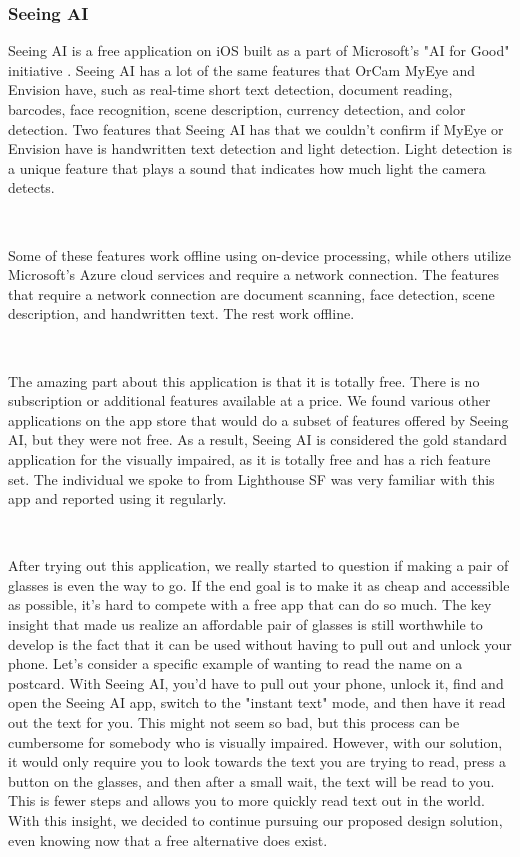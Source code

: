 \documentclass[a4paper,11pt]{article}
\begin{document}
\newpage
\subsubsection{Seeing AI}
Seeing AI is a free application on iOS built as a part of Microsoft's "AI for Good" initiative \cite{seeing-ai}. Seeing AI has a lot of the same features that OrCam MyEye and Envision have, such as real-time short text detection, document reading, barcodes, face recognition, scene description, currency detection, and color detection. Two features that Seeing AI has that we couldn't confirm if MyEye or Envision have is handwritten text detection and light detection. Light detection is a unique feature that plays a sound that indicates how much light the camera detects. 

\

\noindent
Some of these features work offline using on-device processing, while others utilize Microsoft's Azure cloud services and require a network connection. The features that require a network connection are document scanning, face detection, scene description, and handwritten text. The rest work offline.

\ 

\noindent
The amazing part about this application is that it is totally free. There is no subscription or additional features available at a price. We found various other applications on the app store that would do a subset of features offered by Seeing AI, but they were not free. As a result, Seeing AI is considered the gold standard application for the visually impaired, as it is totally free and has a rich feature set. The individual we spoke to from Lighthouse SF was very familiar with this app and reported using it regularly.

\

\noindent
After trying out this application, we really started to question if making a pair of glasses is even the way to go. If the end goal is to make it as cheap and accessible as possible, it's hard to compete with a free app that can do so much. The key insight that made us realize an affordable pair of glasses is still worthwhile to develop is the fact that it can be used without having to pull out and unlock your phone. Let's consider a specific example of wanting to read the name on a postcard. With Seeing AI, you'd have to pull out your phone, unlock it, find and open the Seeing AI app, switch to the "instant text" mode, and then have it read out the text for you. This might not seem so bad, but this process can be cumbersome for somebody who is visually impaired. However, with our solution, it would only require you to look towards the text you are trying to read, press a button on the glasses, and then after a small wait, the text will be read to you. This is fewer steps and allows you to more quickly read text out in the world. With this insight, we decided to continue pursuing our proposed design solution, even knowing now that a free alternative does exist.
\end{document}
